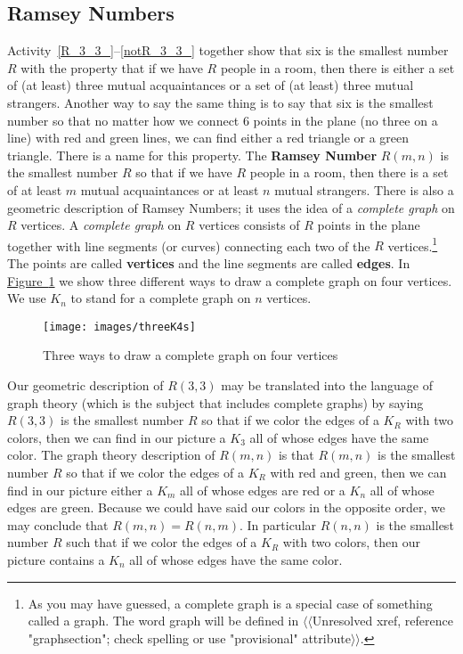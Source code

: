 \documentclass[10pt,]{book}
\newcommand{\terminology}[1]{\textbf{#1}}
\theoremstyle{plain}
\theoremstyle{definition}
\numberwithin{equation}{chapter}
\begin{document}
\subsection[{Ramsey Numbers}]{Ramsey Numbers}\label{Ramseysection}
Activity~\hyperref[R_3_3_]{\ref{R_3_3_}}--\hyperref[notR_3_3_]{\ref{notR_3_3_}} together show that six is the smallest number \(R\) with the property that if we have \(R\) people in a room, then there is either a set of (at least) three mutual acquaintances or a set of (at least) three mutual strangers. Another way to say the same thing is to say that six is the smallest number so that no matter how we connect 6 points in the plane (no three on a line) with red and green lines, we can find either a red triangle or a green triangle. There is a name for this property. The \terminology{Ramsey Number} \(R(m,n)\) is the smallest number \(R\) so that if we have \(R\) people in a room, then there is a set of at least \(m\) mutual acquaintances or at least \(n\) mutual strangers. There is also a geometric description of Ramsey Numbers; it uses the idea of a \emph{complete graph} on \(R\) vertices. A \emph{complete graph} on \(R\) vertices consists of \(R\) points in the plane together with line segments (or curves) connecting each two of the \(R\) vertices.\footnote{As you may have guessed, a complete graph is a special case of something called a graph.  The word graph will be defined in {$\langle\langle$Unresolved xref, reference "graphsection"; check spelling or use "provisional" attribute$\rangle\rangle$}.\label{fn-4}} The points are called \terminology{vertices} and the line segments are called \terminology{edges}. In \hyperref[completegraph]{Figure~\ref{completegraph}} we show three different ways to draw a complete graph on four vertices. We use \(K_n\) to stand for a complete graph on \(n\) vertices.%
\begin{figure}
\centering
\texttt{[image: images/threeK4s]}
\caption{Three ways to draw a complete graph on four vertices\label{completegraph}}
\end{figure}
Our geometric description of \(R(3,3)\) may be translated into the language of graph theory (which is the subject that includes complete graphs) by saying \(R(3,3)\) is the smallest number \(R\) so that if we color the edges of a \(K_R\) with two colors, then we can find in our picture a \(K_3\) all of whose edges have the same color.  The graph theory description of \(R(m,n)\) is that \(R(m,n)\) is the smallest number \(R\) so that if we color the edges of a \(K_R\) with red and green, then we can find in our picture either a \(K_m\) all of whose edges are red or a \(K_n\) all of whose edges are green. Because we could have said our colors in the opposite order, we may conclude that \(R(m,n) = R(n,m)\). In particular \(R(n,n)\) is the smallest number \(R\) such that if we color the edges of a \(K_R\) with two colors, then our picture contains a \(K_n\) all of whose edges have the same color.%
\end{document}
